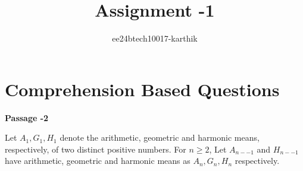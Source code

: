 \documentclass[journal,12pt,twocolumn]{IEEEtran}
\theoremstyle{remark}
\begin{document}

\vspace{3cm}

\title{Assignment -1}
\author{ee24btech10017-karthik}
\maketitle
\newpage
\bigskip

\renewcommand{\thefigure}{\theenumi}
\renewcommand{\thetable}{\theenumi}
\section{\textbf{Comprehension Based Questions}}
\textbf{ \hspace{2cm}    Passage -2}

Let $A_{1}, G_{1}, H_{1} $ denote the arithmetic, geometric and harmonic means, respectively, of two distinct positive numbers. For $n\geq 2$, Let $A_{n--1}$ and $H_{n--1}$ have arithmetic, geometric and harmonic means as $A_{n},G_{n},H_{n}$ respectively.
\end{document}
